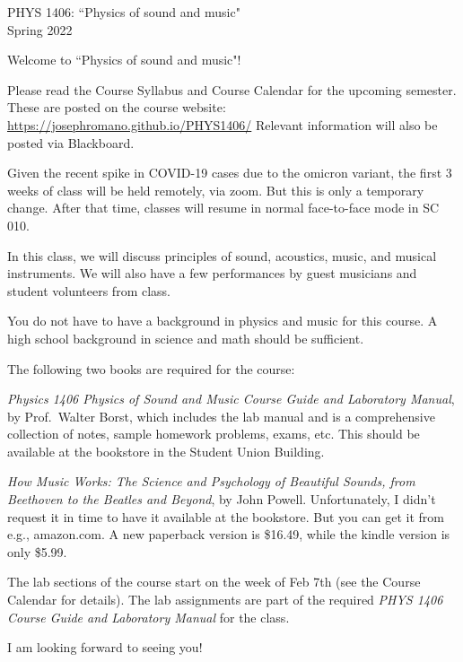 \documentclass[11pt]{NSF}
\begin{document}
\begin{center}
PHYS 1406: ``Physics of sound and music"\\
Spring 2022
\end{center}

Welcome to ``Physics of sound and music"!

Please read the Course Syllabus and Course Calendar for the upcoming semester. 
These are posted on the course website:
\url{https://josephromano.github.io/PHYS1406/}
Relevant information will also be posted via Blackboard.

Given the recent spike in COVID-19 cases due to the omicron variant, 
the first 3 weeks of class will be held remotely, via zoom.  
But this is only a temporary change.  
After that time, classes will resume in normal face-to-face mode
in SC 010.

In this class, we will discuss principles of sound, acoustics, music,
and musical instruments.  We will also have a few performances by
guest musicians %
and student volunteers from class. 

You do not have to have a background in physics and music for this
course. A high school background in science and math should be
sufficient.

The following two books are required for the course:

{\em Physics 1406 Physics of Sound and Music Course Guide and Laboratory Manual}, 
by Prof.~Walter Borst, which includes the lab manual and 
is a comprehensive collection of notes, sample homework problems, 
exams, etc.  
This should be available at the bookstore in the Student Union Building.

{\em How Music Works: The Science and Psychology of Beautiful Sounds, 
from Beethoven to the Beatles and Beyond}, by John Powell.  
Unfortunately, I didn't request it in time to have it available at the bookstore.  
But you can get it from e.g., amazon.com.  
A new paperback version is \$16.49, while the kindle version is only \$5.99.


The lab sections of the course start on the week of Feb 7th
(see the Course Calendar for details).
The lab assignments are part of the required 
{\em PHYS 1406 Course Guide and Laboratory Manual} for the class.

I am looking forward to seeing you!
\end{document}
